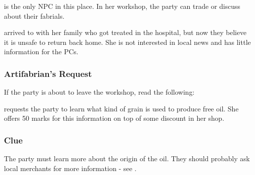 
\npcVedenArtifabrian[s]{} is the only NPC in this place. In her workshop, the party can trade or discuss about their fabrials. 

\npcVedenArtifabrian{} arrived to \locationKharbranth{} with her family who got treated in the hospital, but now they believe it is unsafe to return back home. She is not interested in local news and has little information for the PCs.

\subsubsection{Artifabrian's Request}

If the party is about to leave the workshop, read the following:


\npcVedenArtifabrian{} requests the party to learn what kind of grain is used to produce free oil. She offers 50 marks for this information on top of some discount in her shop.

\subsubsection{Clue}

The party must learn more about the origin of the oil. They should probably ask local merchants for more information - see .
